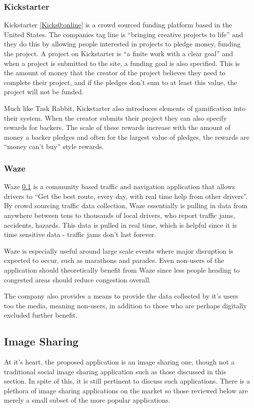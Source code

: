 \documentclass[a4paper]{article}
\begin{document}
\subsubsection{Kickstarter}
Kickstarter \ref{Kicks0:online} is a crowd sourced funding platform based in the United States. The companies tag line is ``bringing creative projects to life'' and they do this by allowing people interested in projects to pledge money, funding the project. A project on Kickstarter is ``a finite work with a clear goal'' and when a project is submitted to the site, a funding goal is also specified. This is the amount of money that the creator of the project believes they need to complete their project, and if the pledges don't sum to at least this value, the project will not be funded. 

Much like Task Rabbit, Kickstarter also introduces elements of gamification into their system. When the creator submits their project they can also specify rewards for backers. The scale of these rewards increase with the amount of money a backer pledges and often for the largest value of pledges, the rewards are ``money can't buy'' style rewards.


\subsubsection{Waze}

Waze \ref{} is a community based traffic and navigation application that allows drivers to ``Get the best route, every day,
with real time help from other drivers''. By crowd sourcing traffic data collection, Waze essentially is pulling in data from anywhere between tens to thousands of local drivers, who report traffic jams, accidents, hazards. This data is pulled in real time, which is helpful since it is time sensitive data - traffic jams don't last forever.

Waze is especially useful around large scale events where major disruption is expected to occur, such as marathons and parades. Even non-users of the application should theoretically benefit from Waze since less people heading to congested areas should reduce congestion overall.

The company also provides a means to provide the data collected by it's users too the media, meaning non-users, in addition to those who are perhaps digitally excluded further benefit.

\subsection{Image Sharing}
At it's heart, the proposed application is an image sharing one, though not a traditional social image sharing application such as those discussed in this section. In spite of this, it is still pertinent to discuss such applications. There is a plethora of image sharing applications on the market so those reviewed below are merely a small subset of the more popular applications.
\end{document}
